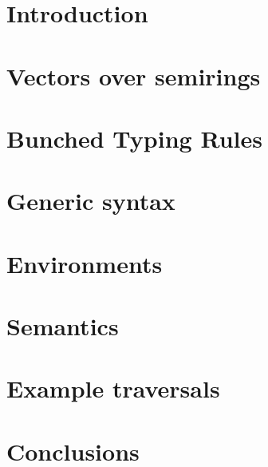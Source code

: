 \documentclass[runningheads]{llncs}
\begin{document}
\section{Introduction}\label{sec:intro}


\section{Vectors over semirings}\label{sec:algebra}


\section{Bunched Typing Rules}\label{sec:bunched-rules}


\section{Generic syntax}\label{sec:syntax}


\section{Environments}\label{sec:env}


\section{Semantics}\label{sec:semantics}


\section{Example traversals}\label{sec:examples}


\section{Conclusions}\label{sec:conc}
%
%
%


\end{document}
